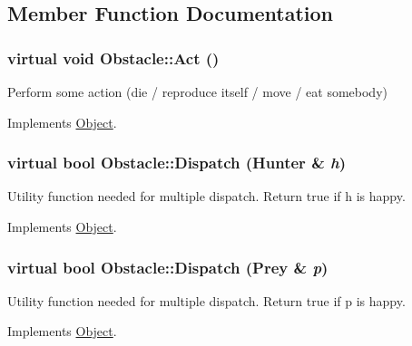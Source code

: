 \subsection{Member Function Documentation}
\hypertarget{classObstacle_a4e1f98a918838ca96638e7536e3748cb}{
\subsubsection[{Act}]{\setlength{\rightskip}{0pt plus 5cm}virtual void Obstacle::Act ()}}
\label{classObstacle_a4e1f98a918838ca96638e7536e3748cb}
Perform some action (die / reproduce itself / move / eat somebody) 

Implements \hyperlink{classObject_a683b351ee47dc69c4117cb9017c467d6}{Object}.

\hypertarget{classObstacle_a8428a9d636c30b7c06d31066ad0dc412}{
\subsubsection[{Dispatch}]{\setlength{\rightskip}{0pt plus 5cm}virtual bool Obstacle::Dispatch ({\bf Hunter} \& {\em h})}}
\label{classObstacle_a8428a9d636c30b7c06d31066ad0dc412}
Utility function needed for multiple dispatch. Return true if h is happy. 

Implements \hyperlink{classObject_a0d0e1f0456837f6736913b1ba374f11d}{Object}.

\hypertarget{classObstacle_a930bb5cb375a6554ecc76f98a8ecaf0d}{
\subsubsection[{Dispatch}]{\setlength{\rightskip}{0pt plus 5cm}virtual bool Obstacle::Dispatch ({\bf Prey} \& {\em p})}}
\label{classObstacle_a930bb5cb375a6554ecc76f98a8ecaf0d}
Utility function needed for multiple dispatch. Return true if p is happy. 

Implements \hyperlink{classObject_a70097e3ad4433aec0dd0b938fcedfeca}{Object}.

